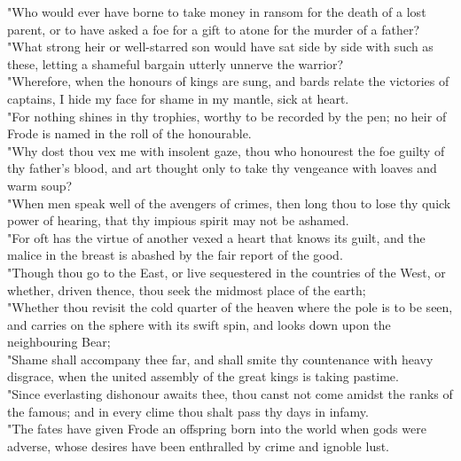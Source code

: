 \documentclass[10pt,a4paper]{report}
\begin{document}
"Who would ever have borne to take money in ransom for the death of a lost parent, or to have asked a foe for a gift to atone for the murder of a father?\\

"What strong heir or well-starred son would have sat side by side with such as these, letting a shameful bargain utterly unnerve the warrior?\\

"Wherefore, when the honours of kings are sung, and bards relate the victories of captains, I hide my face for shame in my mantle, sick at heart.\\

"For nothing shines in thy trophies, worthy to be recorded by the pen; no heir of Frode is named in the roll of the honourable.\\

"Why dost thou vex me with insolent gaze, thou who honourest the foe guilty of thy father's blood, and art thought only to take thy vengeance with loaves and warm soup?\\

"When men speak well of the avengers of crimes, then long thou to lose thy quick power of hearing, that thy impious spirit may not be ashamed.\\

"For oft has the virtue of another vexed a heart that knows its guilt, and the malice in the breast is abashed by the fair report of the good.\\

"Though thou go to the East, or live sequestered in the countries of the West, or whether, driven thence, thou seek the midmost place of the earth;\\

"Whether thou revisit the cold quarter of the heaven where the pole is to be seen, and carries on the sphere with its swift spin, and looks down upon the neighbouring Bear;\\

"Shame shall accompany thee far, and shall smite thy countenance with heavy disgrace, when the united assembly of the great kings is taking pastime.\\

"Since everlasting dishonour awaits thee, thou canst not come amidst the ranks of the famous; and in every clime thou shalt pass thy days in infamy.\\

"The fates have given Frode an offspring born into the world when gods were adverse, whose desires have been enthralled by crime and ignoble lust.\\
\end{document}
